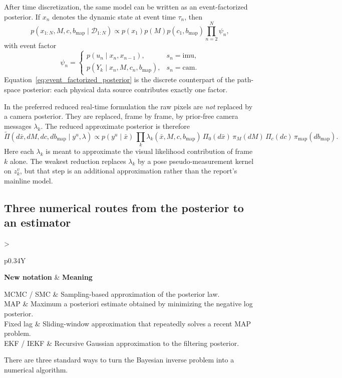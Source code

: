 \documentclass[11pt]{report}
\newcommand{\NotationTable}[1]{%
\vspace{0.6mm}
{\scriptsize
\setlength{\tabcolsep}{2.5pt}
\begin{tabularx}{\columnwidth}{>{\raggedright\arraybackslash}p{0.34\columnwidth}Y}
\toprule
\textbf{New notation} & \textbf{Meaning}\\
\midrule
#1\\
\bottomrule
\end{tabularx}}
\vspace{0.8mm}}
\begin{document}
After time discretization, the same model can be written as an event-factorized posterior. If $x_n$ denotes the dynamic state at event time $\tau_n$, then
\begin{equation}
p(x_{1:N},M,c,b_{\mathrm{map}}\mid \mathcal D_{1:N})
\propto
p(x_1)p(M)p(c_1,b_{\mathrm{map}})\prod_{n=2}^{N}\psi_n,
\label{eq:event_factorized_posterior}
\end{equation}
with event factor
\[
\psi_n=
\begin{cases}
p(u_n\mid x_n,x_{n-1}), & s_n=\mathrm{imu},\\[1mm]
p(Y_k\mid x_n,M,c_n,b_{\mathrm{map}}), & s_n=\mathrm{cam}.
\end{cases}
\]
Equation~\eqref{eq:event_factorized_posterior} is the discrete counterpart of the path-space posterior: each physical data source contributes exactly one factor.

In the preferred reduced real-time formulation the raw pixels are \emph{not} replaced by a camera posterior. They are replaced, frame by frame, by prior-free camera messages $\lambda_k$. The reduced approximate posterior is therefore
\begin{equation}
\widetilde\Pi(d\bar x,dM,dc,db_{\mathrm{map}}\mid y^u,\lambda)
\propto
p(y^u\mid \bar x)\,
\prod_k \lambda_k(\bar x,M,c,b_{\mathrm{map}})\,
\Pi_0(d\bar x)\,\pi_M(dM)\,\Pi_c(dc)\,\pi_{\mathrm{map}}(db_{\mathrm{map}}).
\label{eq:reduced_path_space_posterior_sweep}
\end{equation}
Here each $\lambda_k$ is meant to approximate the visual likelihood contribution of frame $k$ alone. The weakest reduction replaces $\lambda_k$ by a pose pseudo-measurement kernel on $z_k^v$, but that step is an additional approximation rather than the report's mainline model.

\subsection{Three numerical routes from the posterior to an estimator}
\NotationTable{
MCMC / SMC & Sampling-based approximation of the posterior law.\\
MAP & Maximum a posteriori estimate obtained by minimizing the negative log posterior.\\
Fixed lag & Sliding-window approximation that repeatedly solves a recent MAP problem.\\
EKF / IEKF & Recursive Gaussian approximation to the filtering posterior.}

There are three standard ways to turn the Bayesian inverse problem into a numerical algorithm.
\end{document}
